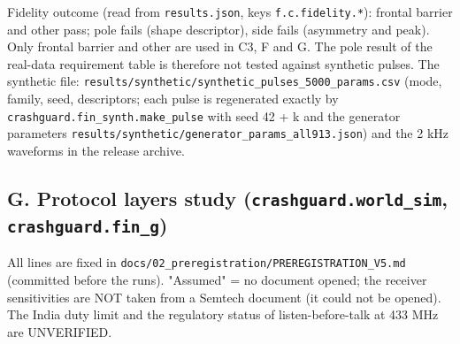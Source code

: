 Fidelity outcome (read from \texttt{results.json}, keys \texttt{f.c.fidelity.*}): frontal barrier and other pass; pole fails (shape descriptor), side fails (asymmetry and peak). Only frontal barrier and other are used in C3, F and G. The pole result of the real-data requirement table is therefore not tested against synthetic pulses.
The synthetic file: \texttt{results/synthetic/synthetic\_pulses\_5000\_params.csv} (mode, family, seed, descriptors; each pulse is regenerated exactly by \texttt{crashguard.fin\_synth.make\_pulse} with seed 42 + k and the generator parameters \texttt{results/synthetic/generator\_params\_all913.json}) and the 2 kHz waveforms in the release archive.



\subsection*{G. Protocol layers study (\texttt{crashguard.world\_sim}, \texttt{crashguard.fin\_g})}

All lines are fixed in \texttt{docs/02\_preregistration/PREREGISTRATION\_V5.md} (committed before the runs). "Assumed" = no document opened; the receiver sensitivities are NOT taken from a Semtech document (it could not be opened). The India duty limit and the regulatory status of listen-before-talk at 433 MHz are UNVERIFIED.


